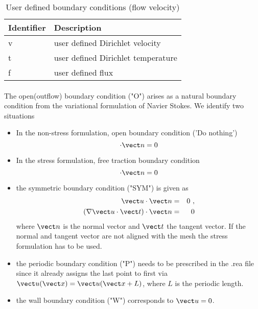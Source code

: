 \begin{table}
\begin{tabular}{ |l|l| }
   \hline
   Identifier & Description\\ \hline \hline
v  &      user defined Dirichlet velocity\\
t   &     user defined Dirichlet temperature\\
f    &    user defined flux\\
   \hline
\end{tabular}
\caption{User defined boundary conditions (flow velocity)}\label{tab:userBCf}
\end{table}

\paragraph*{}
The open(outflow) boundary condition ("O") arises as a natural boundary condition from the variational formulation of Navier Stokes. We identify two situations
\begin{itemize}
\item In the non-stress formulation, open boundary condition ('Do nothing')
\begin{equation}
[-p\vect I + \nu(\nabla \vect u)]\cdot \vect n=0
\end{equation}
\item In the stress formulation, free traction boundary condition
\begin{equation}
[-p\vect I + \nu(\nabla \vect u+\nabla \vect u^T)]\cdot \vect n=0
\end{equation}

\item the symmetric boundary condition ("SYM") is given as
\begin{eqnarray}
\vect u \cdot \vect n&=&0\ ,\\
(\nabla \vect u \cdot \vect t)\cdot \vect n&=&0
\end{eqnarray}
where \(\vect n\) is the normal vector and \(\vect t\) the tangent vector. If the normal and tangent vector are not aligned with the mesh the stress formulation has to be used.


\item the periodic boundary condition ("P") needs to be prescribed in the .rea file since it already assigns the last point to first via \(\vect u(\vect x)=\vect u(\vect x + L) \), where \(L\) is the periodic length.

\item the wall boundary condition ("W") corresponds to \(\vect u=0\).
\end{itemize}

